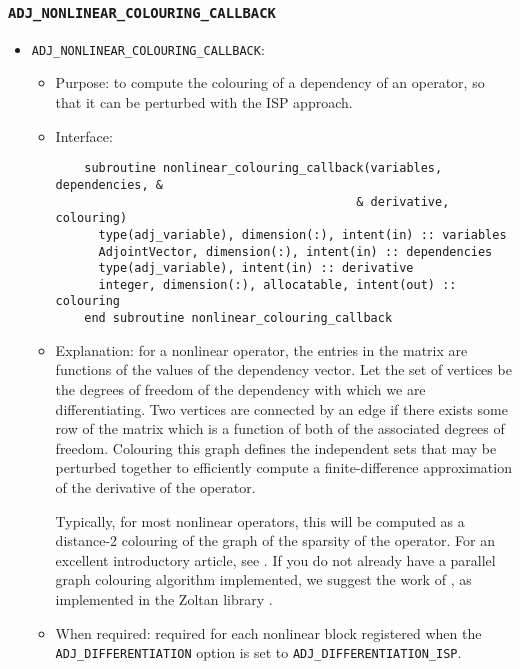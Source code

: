 \documentclass[10pt,authoryear]{elsarticle}
\begin{document}
\subsubsection{\texttt{ADJ\_NONLINEAR\_COLOURING\_CALLBACK}}
\begin{itemize}
\item \texttt{ADJ\_NONLINEAR\_COLOURING\_CALLBACK}:
 \begin{itemize} 
 \item Purpose: to compute the colouring of a dependency of an operator, so that it can be perturbed with the ISP approach.
 \item Interface:
\begin{verbatim}
    subroutine nonlinear_colouring_callback(variables, dependencies, &
                                          & derivative, colouring)
      type(adj_variable), dimension(:), intent(in) :: variables
      AdjointVector, dimension(:), intent(in) :: dependencies
      type(adj_variable), intent(in) :: derivative
      integer, dimension(:), allocatable, intent(out) :: colouring
    end subroutine nonlinear_colouring_callback
\end{verbatim}
 \item Explanation: for a nonlinear operator, the entries in the matrix are functions of the values of the dependency vector.
 Let the set of vertices be the degrees of freedom of the dependency with which we are differentiating. Two vertices are
 connected by an edge if there exists some row of the matrix which is a function of both of the associated degrees of freedom.
 Colouring this graph defines the independent sets that may be perturbed together to efficiently compute a finite-difference
 approximation of the derivative of the operator.

 Typically, for most nonlinear operators, this will be computed as a distance-2 colouring of the graph of the sparsity of the operator.
 For an excellent introductory article, see \citet{gebremedhin2005}. If you do not
 already have a parallel graph colouring algorithm implemented, we suggest the work of \citet{bozdag2005}, as implemented in the Zoltan
 library \citep{devine2002}.
 \item When required: required for each nonlinear block registered when the \texttt{ADJ\_DIFFERENTIATION} option is set to \texttt{ADJ\_DIFFERENTIATION\_ISP}.

 \end{itemize}


\end{itemize}
\end{document}
